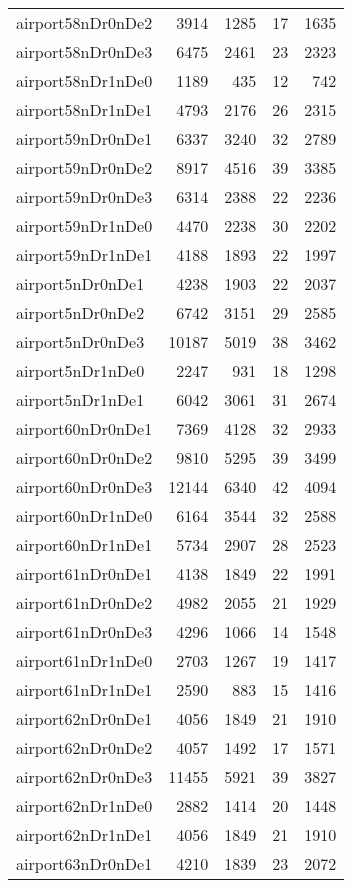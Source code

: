 \begin{longtable}{lrrrr}
airport58nDr0nDe2 & 3914 & 1285 & 17 & 1635 \\
airport58nDr0nDe3 & 6475 & 2461 & 23 & 2323 \\
airport58nDr1nDe0 & 1189 & 435 & 12 & 742 \\
airport58nDr1nDe1 & 4793 & 2176 & 26 & 2315 \\
airport59nDr0nDe1 & 6337 & 3240 & 32 & 2789 \\
airport59nDr0nDe2 & 8917 & 4516 & 39 & 3385 \\
airport59nDr0nDe3 & 6314 & 2388 & 22 & 2236 \\
airport59nDr1nDe0 & 4470 & 2238 & 30 & 2202 \\
airport59nDr1nDe1 & 4188 & 1893 & 22 & 1997 \\
airport5nDr0nDe1 & 4238 & 1903 & 22 & 2037 \\
airport5nDr0nDe2 & 6742 & 3151 & 29 & 2585 \\
airport5nDr0nDe3 & 10187 & 5019 & 38 & 3462 \\
airport5nDr1nDe0 & 2247 & 931 & 18 & 1298 \\
airport5nDr1nDe1 & 6042 & 3061 & 31 & 2674 \\
airport60nDr0nDe1 & 7369 & 4128 & 32 & 2933 \\
airport60nDr0nDe2 & 9810 & 5295 & 39 & 3499 \\
airport60nDr0nDe3 & 12144 & 6340 & 42 & 4094 \\
airport60nDr1nDe0 & 6164 & 3544 & 32 & 2588 \\
airport60nDr1nDe1 & 5734 & 2907 & 28 & 2523 \\
airport61nDr0nDe1 & 4138 & 1849 & 22 & 1991 \\
airport61nDr0nDe2 & 4982 & 2055 & 21 & 1929 \\
airport61nDr0nDe3 & 4296 & 1066 & 14 & 1548 \\
airport61nDr1nDe0 & 2703 & 1267 & 19 & 1417 \\
airport61nDr1nDe1 & 2590 & 883 & 15 & 1416 \\
airport62nDr0nDe1 & 4056 & 1849 & 21 & 1910 \\
airport62nDr0nDe2 & 4057 & 1492 & 17 & 1571 \\
airport62nDr0nDe3 & 11455 & 5921 & 39 & 3827 \\
airport62nDr1nDe0 & 2882 & 1414 & 20 & 1448 \\
airport62nDr1nDe1 & 4056 & 1849 & 21 & 1910 \\
airport63nDr0nDe1 & 4210 & 1839 & 23 & 2072 \\

\end{longtable}
